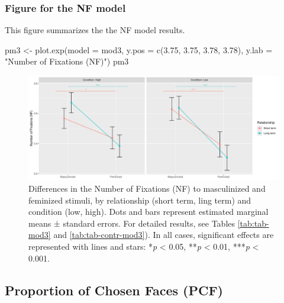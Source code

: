 \documentclass[
  bookmarksnumbered]{article}
\newenvironment{Shaded}{\begin{snugshade}}{\end{snugshade}}
\newcommand{\AttributeTok}[1]{\textcolor[rgb]{0.80,0.80,0.80}{#1}}
\newcommand{\FloatTok}[1]{\textcolor[rgb]{0.75,0.75,0.82}{#1}}
\newcommand{\FunctionTok}[1]{\textcolor[rgb]{0.94,0.94,0.56}{#1}}
\newcommand{\NormalTok}[1]{\textcolor[rgb]{0.80,0.80,0.80}{#1}}
\newcommand{\OtherTok}[1]{\textcolor[rgb]{0.94,0.94,0.56}{#1}}
\newcommand{\StringTok}[1]{\textcolor[rgb]{0.80,0.58,0.58}{#1}}
\begin{document}
\subsubsection{Figure for the NF model}\label{figure-for-the-nf-model}

This figure summarizes the the NF model results.

\begin{Shaded}
\begin{Highlighting}[]
\NormalTok{pm3 }\OtherTok{\textless{}{-}} \FunctionTok{plot.exp}\NormalTok{(}\AttributeTok{model =}\NormalTok{ mod3, }
                \AttributeTok{y.pos =} \FunctionTok{c}\NormalTok{(}\FloatTok{3.75}\NormalTok{, }\FloatTok{3.75}\NormalTok{, }\FloatTok{3.78}\NormalTok{, }\FloatTok{3.78}\NormalTok{),}
                \AttributeTok{y.lab =} \StringTok{"Number of Fixations (NF)"}\NormalTok{)}
\NormalTok{pm3}
\end{Highlighting}
\end{Shaded}

\begin{figure}
\centering
\includegraphics{Supplementary_material_files/figure-latex/fig-mod3-1.pdf}
\caption{\label{fig:fig-mod3}Differences in the Number of Fixations (NF) to masculinized and feminized stimuli, by relationship (short term, ling term) and condition (low, high). Dots and bars represent estimated marginal means ± standard errors. For detailed results, see Tables \ref{tab:tab-mod3} and \ref{tab:tab-contr-mod3}). In all cases, significant effects are represented with lines and stars: *\emph{p} \textless{} 0.05, **\emph{p} \textless{} 0.01, ***\emph{p} \textless{} 0.001.}
\end{figure}

\subsection{Proportion of Chosen Faces (PCF)}\label{proportion-of-chosen-faces-pcf}
\end{document}
